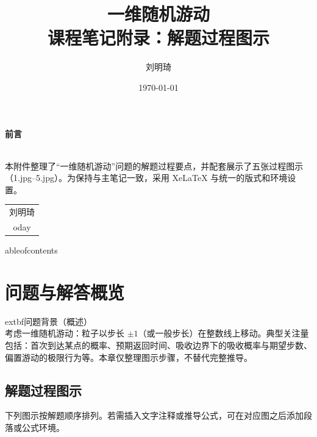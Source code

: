 \documentclass[12pt, a4paper, oneside, fontset=windows]{ctexbook}
\title{{\Huge{一维随机游动}}\\课程笔记附录：解题过程图示}
\author{刘明琦}
\date{\today}
\begin{document}
\maketitle

\setcounter{page}{1}
\begin{center}
	\Huge\textbf{前言}
\end{center}~\\
本附件整理了“一维随机游动”问题的解题过程要点，并配套展示了五张过程图示（1.jpg–5.jpg）。为保持与主笔记一致，采用 XeLaTeX 与统一的版式和环境设置。

\begin{flushright}
	\begin{tabular}{c}
		刘明琦\\
			oday
	\end{tabular}
\end{flushright}

\newpage
{}
\setcounter{page}{1}
	ableofcontents
\newpage
\setcounter{page}{1}

\chapter{问题与解答概览}

\begin{tcolorbox}
	extbf{问题背景（概述）}\\
考虑一维随机游动：粒子以步长 $\pm 1$（或一般步长）在整数线上移动。典型关注量包括：首次到达某点的概率、预期返回时间、吸收边界下的吸收概率与期望步数、偏置游动的极限行为等。本章仅整理图示步骤，不替代完整推导。
\end{tcolorbox}

\section{解题过程图示}
下列图示按解题顺序排列。若需插入文字注释或推导公式，可在对应图之后添加段落或公式环境。
\end{document}
